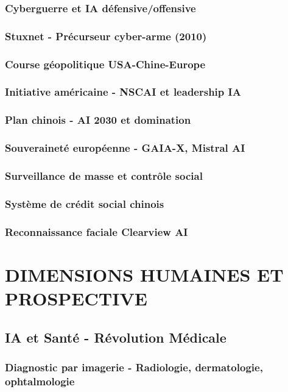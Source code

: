 \documentclass[12pt,a4paper]{book}
\begin{document}
\section{Cyberguerre et IA défensive/offensive}
\section{Stuxnet - Précurseur cyber-arme (2010)}
\section{Course géopolitique USA-Chine-Europe}
\section{Initiative américaine - NSCAI et leadership IA}
\section{Plan chinois - AI 2030 et domination}
\section{Souveraineté européenne - GAIA-X, Mistral AI}
\section{Surveillance de masse et contrôle social}
\section{Système de crédit social chinois}
\section{Reconnaissance faciale Clearview AI}

\part{DIMENSIONS HUMAINES ET PROSPECTIVE}

\chapter{IA et Santé - Révolution Médicale}
\section{Diagnostic par imagerie - Radiologie, dermatologie, ophtalmologie}
\end{document}
